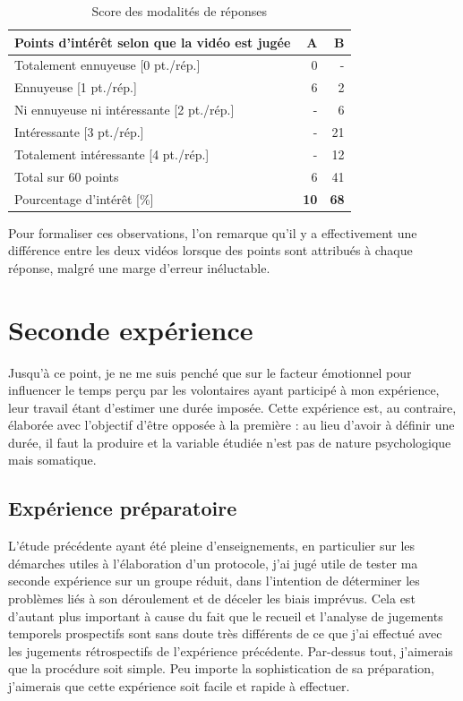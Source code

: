 \documentclass[12pt,fleqn,oneside,french,openany]{book} %
\begin{document}
\begin{table}[h]
	\centering
	\caption{Score des modalités de réponses} \label{tbl:analyse1.2}
	\begin{tabular}{lrr}
		\toprule
		\textbf{Points d'intérêt selon que la vidéo est jugée} & \textbf{A} & \textbf{B} \\ \midrule
		Totalement ennuyeuse [0 pt./rép.] & 0 & - \\ 
		Ennuyeuse [1 pt./rép.] & 6 & 2 \\
		Ni ennuyeuse ni intéressante [2 pt./rép.] & - & 6 \\
		Intéressante [3 pt./rép.] & - & 21 \\ 
		Totalement intéressante [4 pt./rép.] & - & 12 \\ \cmidrule{2-3}
		Total sur 60 points & 6 & 41 \\ 
		Pourcentage d'intérêt [\%] & \textbf{10} & \textbf{68} \\ \bottomrule
	\end{tabular}
\end{table}

Pour formaliser ces observations, l'on remarque qu'il y a effectivement une différence entre les deux vidéos lorsque des points sont attribués à chaque réponse, malgré une marge d'erreur inéluctable.

\newpage
\section{Seconde expérience} \label{sec:exp2.1}
Jusqu'à ce point, je ne me suis penché que sur le facteur émotionnel pour influencer le temps perçu par les volontaires ayant participé à mon expérience, leur travail étant d'estimer une durée imposée. Cette expérience est, au contraire, élaborée avec l'objectif d'être opposée à la première : au lieu d'avoir à définir une durée, il faut la produire et la variable étudiée n'est pas de nature psychologique mais somatique. 

\subsection{Expérience préparatoire} \label{ssec:but2.1}
L'étude précédente ayant été pleine d'enseignements, en particulier sur les démarches utiles à l'élaboration d'un protocole, j'ai jugé utile de tester ma seconde expérience sur un groupe réduit, dans l'intention de déterminer les problèmes liés à son déroulement et de déceler les biais imprévus. Cela est d'autant plus important à cause du fait que le recueil et l'analyse de jugements temporels prospectifs sont sans doute très différents de ce que j'ai effectué avec les jugements rétrospectifs de l'expérience précédente. Par-dessus tout, j'aimerais que la procédure soit simple. Peu importe la sophistication de sa préparation, j'aimerais que cette expérience soit facile et rapide à effectuer.
\end{document}
